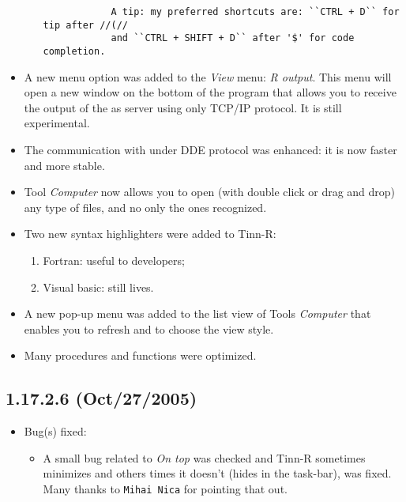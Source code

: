 \begin{itemize}
\begin{enumerate}
        \begin{footnotesize}
          \begin{verbatim}
            A tip: my preferred shortcuts are: ``CTRL + D`` for tip after //(//
            and ``CTRL + SHIFT + D`` after '$' for code completion.
          \end{verbatim}
        \end{footnotesize}

    \end{enumerate}
  \item A new menu option was added to the \textit{View} menu:
    \textit{R output}. This menu will open a new window on the
    bottom of the program that allows you to receive the output
    of the \RR{} as server using only TCP/IP protocol. It is still
    experimental.
  \item The communication with \RR{} under DDE protocol was enhanced:
    it is now faster and more stable.
  \item Tool \textit{Computer} now allows you to open (with double
    click or drag and drop) any type of files, and no only
    the ones recognized.
  \item Two new syntax highlighters were added to Tinn-R:
    \begin{enumerate}
      \item Fortran: useful to \RR{} developers;
      \item Visual basic: still lives.
    \end{enumerate}
  \item A new pop-up menu was added to the list view of Tools
    \textit{Computer} that enables you to refresh and to choose
    the view style.
  \item Many procedures and functions were optimized.
\end{itemize}


\subsection*{1.17.2.6 (Oct/27/2005)}
\begin{itemize}
  \item Bug(s) fixed:
    \begin{itemize}
      \item A small bug related to \textit{On top} was checked and Tinn-R sometimes
        minimizes and others times it doesn't (hides in the task-bar), was fixed. Many
        thanks to \texttt{Mihai Nica} for pointing that out.
    \end{itemize}
\end{itemize}


